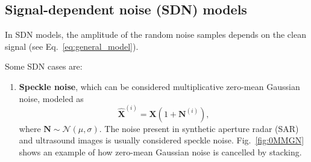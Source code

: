 \documentclass{article}
\begin{document}
\subsection{Signal-dependent noise (SDN) models}
In SDN models, the amplitude of the random noise samples depends on
the clean signal (see Eq.~\ref{eq:general_model}).


Some SDN cases are:
\begin{enumerate}
\item \textbf{Speckle noise}, which can be considered multiplicative
  zero-mean Gaussian noise, modeled as
  \begin{equation}
    \hat{\mathbf X}^{(i)} = {\mathbf X} (1 + {\mathbf N}^{(i)}),
    \label{eq:MGN}
  \end{equation}
  where ${\mathbf N}\sim{\mathcal N}(\mu,\sigma)$. The noise present
  in synthetic aperture radar (SAR) and ultrasound images is usually
  considered speckle noise. Fig.~\ref{fig:0MMGN} shows an example of
  how zero-mean Gaussian noise is cancelled by stacking.


\end{enumerate}
\end{document}
